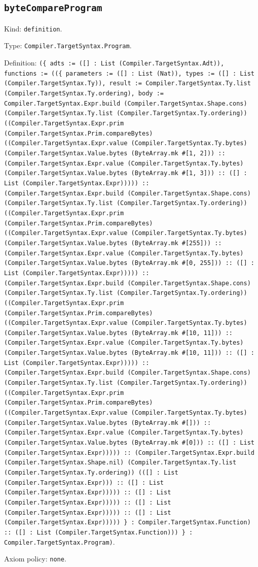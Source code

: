 \documentclass[11pt]{article}
\begin{document}
\subsection*{\texttt{byteCompareProgram}}
\noindent Kind: \texttt{definition}.\par
\noindent Type: \texttt{Compiler.TargetSyntax.Program}.\par
\noindent Definition: \texttt{(\{ adts := ([] : List (Compiler.TargetSyntax.Adt)), functions := ((\{ parameters := ([] : List (Nat)), types := ([] : List (Compiler.TargetSyntax.Ty)), result := Compiler.TargetSyntax.Ty.list (Compiler.TargetSyntax.Ty.ordering), body := Compiler.TargetSyntax.Expr.build (Compiler.TargetSyntax.Shape.cons) (Compiler.TargetSyntax.Ty.list (Compiler.TargetSyntax.Ty.ordering)) ((Compiler.TargetSyntax.Expr.prim (Compiler.TargetSyntax.Prim.compareBytes) ((Compiler.TargetSyntax.Expr.value (Compiler.TargetSyntax.Ty.bytes) (Compiler.TargetSyntax.Value.bytes (ByteArray.mk \#[1, 2])) :: (Compiler.TargetSyntax.Expr.value (Compiler.TargetSyntax.Ty.bytes) (Compiler.TargetSyntax.Value.bytes (ByteArray.mk \#[1, 3])) :: ([] : List (Compiler.TargetSyntax.Expr))))) :: (Compiler.TargetSyntax.Expr.build (Compiler.TargetSyntax.Shape.cons) (Compiler.TargetSyntax.Ty.list (Compiler.TargetSyntax.Ty.ordering)) ((Compiler.TargetSyntax.Expr.prim (Compiler.TargetSyntax.Prim.compareBytes) ((Compiler.TargetSyntax.Expr.value (Compiler.TargetSyntax.Ty.bytes) (Compiler.TargetSyntax.Value.bytes (ByteArray.mk \#[255])) :: (Compiler.TargetSyntax.Expr.value (Compiler.TargetSyntax.Ty.bytes) (Compiler.TargetSyntax.Value.bytes (ByteArray.mk \#[0, 255])) :: ([] : List (Compiler.TargetSyntax.Expr))))) :: (Compiler.TargetSyntax.Expr.build (Compiler.TargetSyntax.Shape.cons) (Compiler.TargetSyntax.Ty.list (Compiler.TargetSyntax.Ty.ordering)) ((Compiler.TargetSyntax.Expr.prim (Compiler.TargetSyntax.Prim.compareBytes) ((Compiler.TargetSyntax.Expr.value (Compiler.TargetSyntax.Ty.bytes) (Compiler.TargetSyntax.Value.bytes (ByteArray.mk \#[10, 11])) :: (Compiler.TargetSyntax.Expr.value (Compiler.TargetSyntax.Ty.bytes) (Compiler.TargetSyntax.Value.bytes (ByteArray.mk \#[10, 11])) :: ([] : List (Compiler.TargetSyntax.Expr))))) :: (Compiler.TargetSyntax.Expr.build (Compiler.TargetSyntax.Shape.cons) (Compiler.TargetSyntax.Ty.list (Compiler.TargetSyntax.Ty.ordering)) ((Compiler.TargetSyntax.Expr.prim (Compiler.TargetSyntax.Prim.compareBytes) ((Compiler.TargetSyntax.Expr.value (Compiler.TargetSyntax.Ty.bytes) (Compiler.TargetSyntax.Value.bytes (ByteArray.mk \#[])) :: (Compiler.TargetSyntax.Expr.value (Compiler.TargetSyntax.Ty.bytes) (Compiler.TargetSyntax.Value.bytes (ByteArray.mk \#[0])) :: ([] : List (Compiler.TargetSyntax.Expr))))) :: (Compiler.TargetSyntax.Expr.build (Compiler.TargetSyntax.Shape.nil) (Compiler.TargetSyntax.Ty.list (Compiler.TargetSyntax.Ty.ordering)) (([] : List (Compiler.TargetSyntax.Expr))) :: ([] : List (Compiler.TargetSyntax.Expr))))) :: ([] : List (Compiler.TargetSyntax.Expr))))) :: ([] : List (Compiler.TargetSyntax.Expr))))) :: ([] : List (Compiler.TargetSyntax.Expr))))) \} : Compiler.TargetSyntax.Function) :: ([] : List (Compiler.TargetSyntax.Function))) \} : Compiler.TargetSyntax.Program)}.\par
\noindent Axiom policy: \texttt{none}.\par
\end{document}
